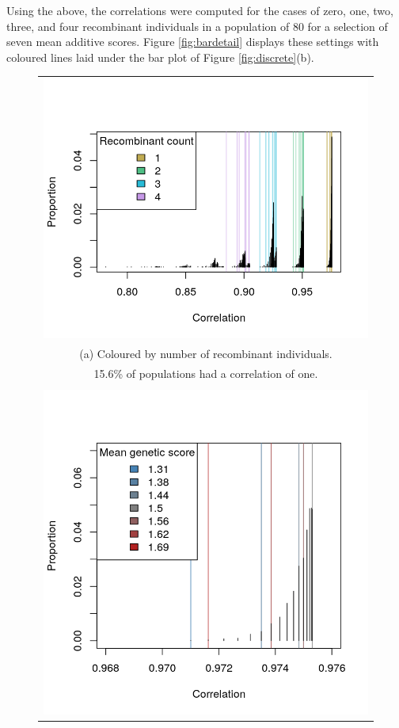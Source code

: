 \documentclass[sts]{imsart}
\begin{document}
Using the above, the correlations were computed for the cases of zero, one, two, three, and four recombinant individuals in a population of 80 for a selection of seven mean additive scores. Figure \ref{fig:bardetail} displays these settings with coloured lines laid under the bar plot of Figure \ref{fig:discrete}(b).
\begin{figure}[htp]
  \begin{center}
    \begin{tabular}{c}
      \includegraphics[scale = 0.6]{../img/strngBarLndscp.png} \\ %
      {\footnotesize (a) Coloured by number of recombinant individuals.} \\
      {\footnotesize 15.6\% of populations had a correlation of one.  } \\
      \\
      \includegraphics[scale = 0.6]{../img/strngBarClose.png} \\

\end{tabular}
\end{center}
\end{figure}
\end{document}
